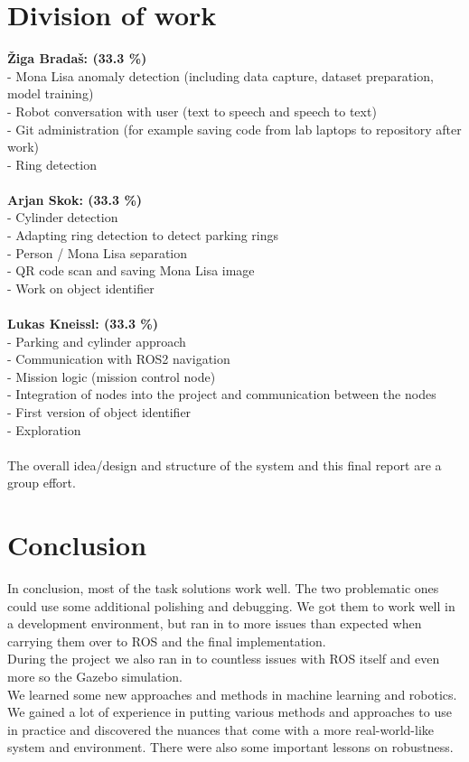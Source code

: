 \documentclass[a4paper,
  twoside, %
  headlines=2.1 %
  ]{scrartcl}
\begin{document}
\section{Division of work}
\textbf{Žiga Bradaš: (33.3 \%)}\\
- Mona Lisa anomaly detection (including data capture, dataset preparation, model training)\\
- Robot conversation with user (text to speech and speech to text)\\
- Git administration (for example saving code from lab laptops to repository after work)\\
- Ring detection\\
\\
\textbf{Arjan Skok: (33.3 \%)}\\
- Cylinder detection\\
- Adapting ring detection to detect parking rings\\
- Person / Mona Lisa separation\\
- QR code scan and saving Mona Lisa image\\
- Work on object identifier\\
\\
\textbf{Lukas Kneissl: (33.3 \%)}\\
- Parking and cylinder approach\\
- Communication with ROS2 navigation\\
- Mission logic (mission control node)\\
- Integration of nodes into the project and communication between the nodes\\
- First version of object identifier\\
- Exploration
\\
\\
The overall idea/design and structure of the system and this final report are a group effort.

\newpage

\section{Conclusion}
In conclusion, most of the task solutions work well. The two problematic ones could use some additional polishing and debugging. We got them to work well in a development environment, but ran in to more issues than expected when carrying them over to ROS and the final implementation. 
\\
During the project we also ran in to countless issues with ROS itself and even more so the Gazebo simulation. 
\\
We learned some new approaches and methods in machine learning and robotics. We gained a lot of experience in putting various methods and approaches to use in practice and discovered the nuances that come with a more real-world-like system and environment. There were also some important lessons on robustness.
\end{document}
